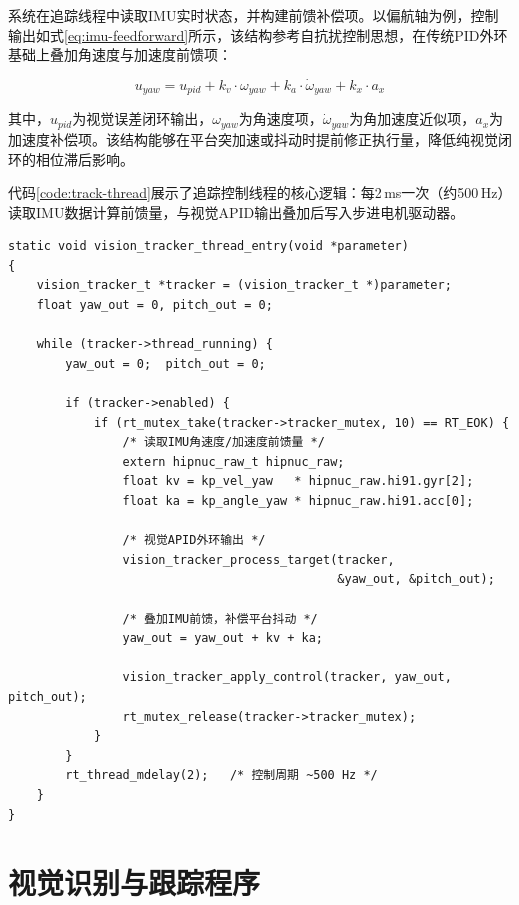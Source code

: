 系统在追踪线程中读取IMU实时状态，并构建前馈补偿项。以偏航轴为例，控制输出如式\eqref{eq:imu-feedforward}所示，该结构参考自抗扰控制思想\cite{Han2009ADRC}，在传统PID外环基础上叠加角速度与加速度前馈项：

\begin{equation}
u_{yaw}=u_{pid}+k_v\cdot \omega_{yaw}+k_a\cdot \dot{\omega}_{yaw}+k_x\cdot a_x
\label{eq:imu-feedforward}
\end{equation}

其中，\(u_{pid}\)为视觉误差闭环输出，\(\omega_{yaw}\)为角速度项，\(\dot{\omega}_{yaw}\)为角加速度近似项，\(a_x\)为加速度补偿项。该结构能够在平台突加速或抖动时提前修正执行量，降低纯视觉闭环的相位滞后影响\cite{Han2009ADRC}。

代码\ref{code:track-thread}展示了追踪控制线程的核心逻辑：每2\,ms一次（约500\,Hz）读取IMU数据计算前馈量，与视觉APID输出叠加后写入步进电机驱动器。

\begin{lstlisting}[style=cstyle, caption={视觉追踪线程与IMU前馈补偿（laser\_gimbal\_vision\_tracker.c）}, label=code:track-thread]
static void vision_tracker_thread_entry(void *parameter)
{
    vision_tracker_t *tracker = (vision_tracker_t *)parameter;
    float yaw_out = 0, pitch_out = 0;

    while (tracker->thread_running) {
        yaw_out = 0;  pitch_out = 0;

        if (tracker->enabled) {
            if (rt_mutex_take(tracker->tracker_mutex, 10) == RT_EOK) {
                /* 读取IMU角速度/加速度前馈量 */
                extern hipnuc_raw_t hipnuc_raw;
                float kv = kp_vel_yaw   * hipnuc_raw.hi91.gyr[2];
                float ka = kp_angle_yaw * hipnuc_raw.hi91.acc[0];

                /* 视觉APID外环输出 */
                vision_tracker_process_target(tracker,
                                              &yaw_out, &pitch_out);

                /* 叠加IMU前馈，补偿平台抖动 */
                yaw_out = yaw_out + kv + ka;

                vision_tracker_apply_control(tracker, yaw_out, pitch_out);
                rt_mutex_release(tracker->tracker_mutex);
            }
        }
        rt_thread_mdelay(2);   /* 控制周期 ~500 Hz */
    }
}
\end{lstlisting}

\section{视觉识别与跟踪程序}

